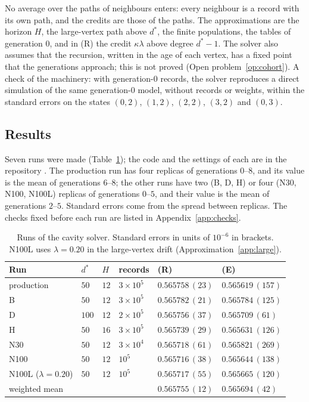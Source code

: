 \documentclass[11pt]{article}
\theoremstyle{plain}
\theoremstyle{definition}
\theoremstyle{remark}
\begin{document}
No average over the paths of neighbours enters: every neighbour is a record with its own path, and the credits are those of the paths. The approximations are the horizon $H$, the large-vertex path above $d^*$, the finite populations, the tables of generation $0$, and in (R) the credit $\kappa\lambda$ above degree $d^*-1$. The solver also assumes that the recursion, written in the age of each vertex, has a fixed point that the generations approach; this is not proved (Open problem~\ref{op:cohort}). A check of the machinery: with generation-$0$ records, the solver reproduces a direct simulation of the same generation-$0$ model, without records or weights, within the standard errors on the states $(0,2)$, $(1,2)$, $(2,2)$, $(3,2)$ and $(0,3)$.

\subsection{Results}

Seven runs were made (Table~\ref{tab:runs}); the code and the settings of each are in the repository \cite{Repo}. The production run has four replicas of generations $0$--$8$, and its value is the mean of generations $6$--$8$; the other runs have two (B, D, H) or four (N30, N100, N100L) replicas of generations $0$--$5$, and their value is the mean of generations $2$--$5$. Standard errors come from the spread between replicas. The checks fixed before each run are listed in Appendix~\ref{app:checks}.

\begin{table}[H]
\centering
\begin{tabular}{llllll}
\toprule
Run & $d^*$ & $H$ & records & (R) & (E)\\
\midrule
production & $50$ & $12$ & $3\times10^5$ & $0.565758\,(23)$ & $0.565619\,(157)$\\
B & $50$ & $12$ & $3\times10^5$ & $0.565782\,(21)$ & $0.565784\,(125)$\\
D & $100$ & $12$ & $2\times10^5$ & $0.565756\,(37)$ & $0.565709\,(61)$\\
H & $50$ & $16$ & $3\times10^5$ & $0.565739\,(29)$ & $0.565631\,(126)$\\
N30 & $50$ & $12$ & $3\times10^4$ & $0.565718\,(61)$ & $0.565821\,(269)$\\
N100 & $50$ & $12$ & $10^5$ & $0.565716\,(38)$ & $0.565644\,(138)$\\
N100L ($\lambda=0.20$) & $50$ & $12$ & $10^5$ & $0.565717\,(55)$ & $0.565665\,(120)$\\
\midrule
weighted mean & & & & $0.565755\,(12)$ & $0.565694\,(42)$\\
\bottomrule
\end{tabular}
\caption{Runs of the cavity solver. Standard errors in units of $10^{-6}$ in brackets. N100L uses $\lambda=0.20$ in the large-vertex drift (Approximation~\ref{app:large}).}\label{tab:runs}
\end{table}
\end{document}
